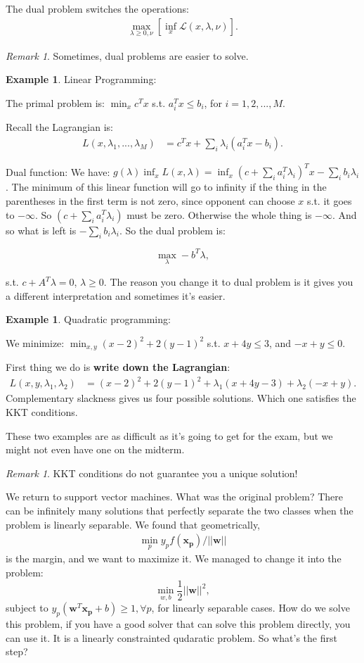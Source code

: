 \documentclass{amsbook}
\theoremstyle{plain}
\numberwithin{section}{chapter}
\numberwithin{equation}{chapter}
\theoremstyle{definition}
\newtheorem{Ex}[theorem]{Example}
\theoremstyle{remark}
\newtheorem{rem}[theorem]{Remark}
\newcommand{\vecc}{\mathbf}
\newcommand{\bee}{\begin{equation}\begin{aligned}}
\newcommand{\eee}{\end{aligned}\end{equation}}
\newcommand{\fracc}{\frac}
\begin{document}
The dual problem switches the operations:
\bee
\max_{\lambda \geq 0, \nu} \left[ \inf_x \mathcal{L}(x, \lambda, \nu) \right].
\eee

\begin{rem}
Sometimes, dual problems are easier to solve. 
\end{rem}

\begin{Ex}
Linear Programming:

The primal problem is: $\min_x c^{T}x$ s.t. $a_i^T x \leq b_i$, for $i = 1,2,...,M$. 

Recall the Lagrangian is:
\bee
L(x,\lambda_1,...,\lambda_M) &= c^T x + \sum_i \lambda_i(a_i^Tx - b_i).
\eee

Dual function:
We have: $g(\lambda) \inf_x L(x, \lambda) = \inf_x (c + \sum_i a_i^T\lambda_i)^T x - \sum_i b_i\lambda_i$. 
The minimum of this linear function will go to infinity if the thing in the parentheses in the first term is not zero, since opponent can choose $x$ s.t. it goes to $-\infty$. So $(c + \sum_i a_i^T\lambda_i)$ must be zero. Otherwise the whole thing is $-\infty$. And so what is left is $-\sum_i b_i \lambda_i$. So the dual problem is:

$$
\max_\lambda -b^T\lambda,
$$

s.t. $c + A^T\lambda = 0$, $\lambda \geq 0$. The reason you change it to dual problem is it gives you a different interpretation and sometimes it's easier. 
\end{Ex}

\begin{Ex}
Quadratic programming:

We minimize: $\min_{x,y} (x - 2)^2 + 2(y - 1)^2$ s.t. $x + 4y \leq 3$, and $-x + y \leq 0$. 

First thing we do is \textbf{write down the Lagrangian}:
\bee
L(x,y,\lambda_1,\lambda_2) &= (x - 2)^2 + 2(y - 1)^2 + \lambda_1(x + 4y - 3) + \lambda_2(-x + y).
\eee
Complementary slackness gives us four possible solutions. Which one satisfies the KKT conditions. 
\end{Ex}

These two examples are as difficult as it's going to get for the exam, but we might not even have one on the midterm. 


\begin{rem}
KKT conditions do not guarantee you a unique solution!
\end{rem}

We return to support vector machines. What was the original problem? There can be infinitely many solutions that perfectly separate the two classes when the problem is linearly separable. We found that geometrically, 
\bee
\min_p y_pf(\vecc{x_p})/||\vecc{w}||
\eee
is the margin, and we want to maximize it. We managed to change it into the problem:
$$
\min_{w,b} \fracc{1}{2}||\vecc{w}||^2,
$$
subject to $y_p(\vecc{w}^T\vecc{x_p} + b) \geq 1, \forall p$, for linearly separable cases. How do we solve this problem, if you have a good solver that can solve this problem directly, you can use it. It is a linearly constrainted qudaratic problem. So what's the first step? 
\end{document}
